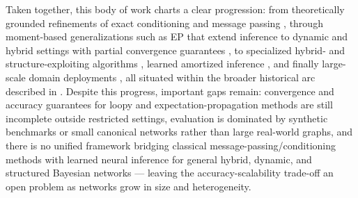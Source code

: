 Taken together, this body of work charts a clear progression: from theoretically grounded refinements of exact conditioning and message passing \cite{darwiche2013conditioning,murphy2013loopy}, through moment-based generalizations such as EP that extend inference to dynamic and hybrid settings with partial convergence guarantees \cite{minka2013expectation,heskes2012expectation}, to specialized hybrid- and structure-exploiting algorithms \cite{gogate2012approximate,huang2013efficient,salmeron2018review}, learned amortized inference \cite{mnih2014neural}, and finally large-scale domain deployments \cite{munozgonzalez2017efficient,zhang2017fuzzy}, all situated within the broader historical arc described in \cite{revista2026network}. Despite this progress, important gaps remain: convergence and accuracy guarantees for loopy and expectation-propagation methods are still incomplete outside restricted settings, evaluation is dominated by synthetic benchmarks or small canonical networks rather than large real-world graphs, and there is no unified framework bridging classical message-passing/conditioning methods with learned neural inference for general hybrid, dynamic, and structured Bayesian networks --- leaving the accuracy-scalability trade-off an open problem as networks grow in size and heterogeneity.

